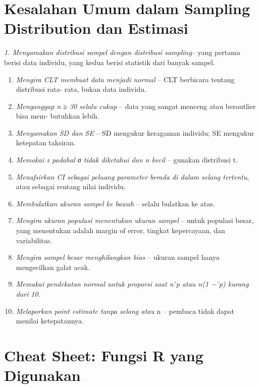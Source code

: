 \documentclass[
  indonesian,
  letterpaper,
]{book}
\begin{document}

\chapter{Kesalahan Umum dalam Sampling Distribution dan
Estimasi}\label{kesalahan-umum-dalam-sampling-distribution-dan-estimasi}

\emph{1. Menyamakan distribusi sampel dengan distribusi sampling}-- yang
pertama berisi data individu, yang kedua berisi statistik dari banyak
sampel.

\begin{enumerate}
\def\labelenumi{\arabic{enumi}.}
\setcounter{enumi}{1}
\item
  \emph{Mengira CLT membuat data menjadi normal} -- CLT berbicara
  tentang distribusi rata- rata, bukan data individu.
\item
  \emph{Menganggap n ≥ 30 selalu cukup} -- data yang sangat menceng atau
  beroutlier bisa mem- butuhkan lebih.
\item
  \emph{Menyamakan SD dan SE} -- SD mengukur keragaman individu; SE
  mengukur ketepatan taksiran.
\item
  \emph{Memakai z padahal σ tidak diketahui dan n kecil} -- gunakan
  distribusi t.
\item
  \emph{Menafsirkan CI sebagai peluang parameter berada di dalam selang
  tertentu}, atau sebagai rentang nilai individu.
\item
  \emph{Membulatkan ukuran sampel ke bawah} -- selalu bulatkan ke atas.
\item
  \emph{Mengira ukuran populasi menentukan ukuran sampel} -- untuk
  populasi besar, yang menentukan adalah margin of error, tingkat
  kepercayaan, dan variabilitas.
\item
  \emph{Mengira sampel besar menghilangkan bias} -- ukuran sampel hanya
  mengecilkan galat acak.
\item
  \emph{Memakai pendekatan normal untuk proporsi saat n ̂p atau n(1 −
  ̂p) kurang dari 10.}
\item
  \emph{Melaporkan point estimate tanpa selang atau} n -- pembaca tidak
  dapat menilai ketepatannya.
\end{enumerate}


\chapter{Cheat Sheet: Fungsi R yang
Digunakan}\label{cheat-sheet-fungsi-r-yang-digunakan}
\end{document}
